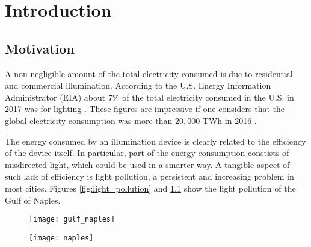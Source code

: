 \chapter{Introduction}
\section{Motivation}
A non-negligible amount of the total electricity consumed is due to residential and commercial illumination.
According to the U.S. Energy Information Administrator (EIA) about $7\%$ of the total electricity consumed in the U.S. in 2017 was for lighting \cite{}. These figures are impressive if one considers that the global electricity consumption was more than $20,000$ TWh in 2016 \cite{}. 

The energy consumed by an illumination device is clearly related to the efficiency of the device itself. 
In particular, part of the energy consumption constists of misdirected light, which could be used in a smarter way. A tangible aspect of such lack of efficiency is light pollution, a persistent and increasing problem in most cities. Figures \ref{fig:light_pollution} and \ref{fig:light_pollution2} show the light pollution of the Gulf of Naples.
\begin{figure}[t]
\centering
  \begin{minipage}[]{0.49\textwidth}
    \texttt{[image: gulf\_naples]}
    \caption{\textbf{}}
    \label{fig:light_pollution}
\end{minipage}
\hfill
 \begin{minipage}[]{ 0.49\textwidth}
    \texttt{[image: naples]}
    \caption{\textbf{}}
    \label{fig:light_pollution2}
\end{minipage}
  \end{figure}

